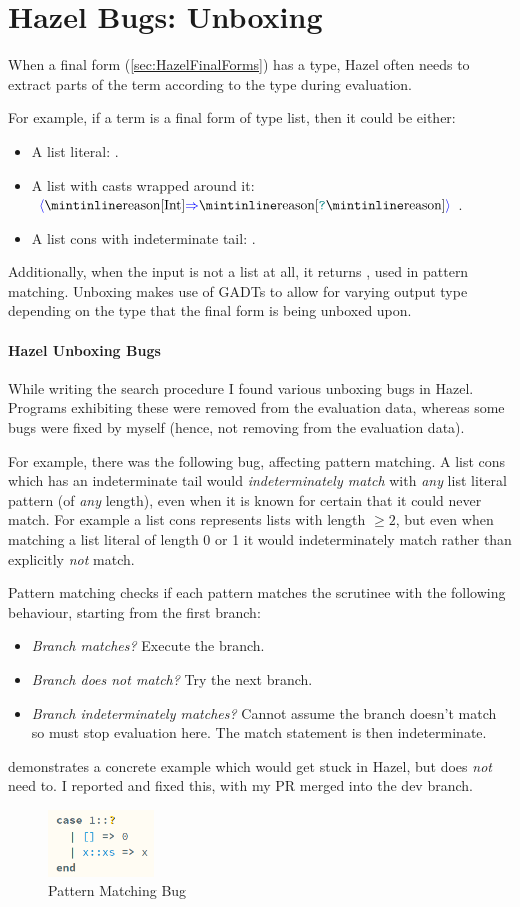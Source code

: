 \chapter{Hazel Bugs: Unboxing}
\label{sec:UnboxingBugs}
When a final form (\cref{sec:HazelFinalForms}) has a type, Hazel often needs to extract parts of the term according to the type during evaluation.

For example, if a term is a final form of type list, then it could be either:
\begin{itemize}
\item A list literal: \code{[1,2,3]}.
\item A list with casts wrapped around it: \code{[1,2,3]}$\scast{\code{[Int]}}{\code{[}\dyn\code{]}}$.
\item A list cons with indeterminate tail: .
\end{itemize}
Additionally, when the input is not a list at all, it returns , used in pattern matching.  Unboxing makes use of GADTs to allow for varying output type depending on the type that the final form is being unboxed upon.

\subsubsection{Hazel Unboxing Bugs}
While writing the search procedure I found various unboxing bugs in Hazel. Programs exhibiting these were removed from the evaluation data, whereas some bugs were fixed by myself (hence, not removing from the evaluation data). 

For example, there was the following bug, affecting pattern matching. A list cons which has an indeterminate tail would \textit{indeterminately match} with \textit{any} list literal pattern (of \textit{any} length), even when it is known for certain that it could never match. For example a list cons  represents lists with length $\geq 2$, but even when matching a list literal of length 0 or 1 it would indeterminately match rather than explicitly \textit{not} match. 

Pattern matching checks if each pattern matches the scrutinee with the following behaviour, starting from the first branch:
\begin{itemize}
\item \textit{Branch matches?} Execute the branch.
\item \textit{Branch does not match?} Try the next branch.
\item \textit{Branch indeterminately matches?} Cannot assume the branch doesn't match so must stop evaluation here. The match statement is then indeterminate.
\end{itemize}
 demonstrates a concrete example which would get stuck in Hazel, but does \textit{not} need to. I reported and fixed this, with my PR merged into the dev branch.

\begin{figure}[H]
\centering
\includegraphics[width=0.25\textwidth]{Media/Figures/unboxing_bug}
\caption{Pattern Matching Bug}
\label{fig:PatternMatchingBug}
\end{figure}

